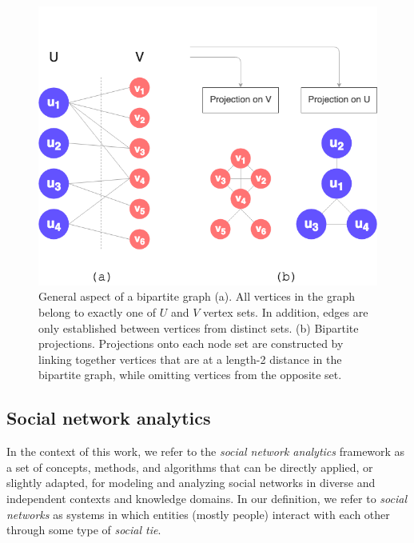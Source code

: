 \begin{figure}[h!]
  	\centering
    \includegraphics[width=0.5\linewidth]{figures/bipartite_general.png}
    \caption[General aspect of bipartite graphs and their projections]{General aspect of a bipartite graph (a). All vertices in the graph belong to exactly one of $U$ and $V$ vertex sets. In addition, edges are only established between vertices from distinct sets. (b) Bipartite projections. Projections onto each node set are constructed by linking together vertices that are at a length-2 distance in the bipartite graph, while omitting vertices from the opposite set.}
    \label{fig:bipartite_general}
  \end{figure}


\subsection{Social network analytics}
In the context of this work, we refer to the \textit{social network analytics} framework as a set of concepts, methods, and algorithms that can be directly applied, or slightly adapted, for modeling and analyzing social networks in diverse and independent contexts and knowledge domains.
%
In our definition, we refer to \textit{social networks} as systems in which entities (mostly people) interact with each other through some type of \textit{social tie}.

